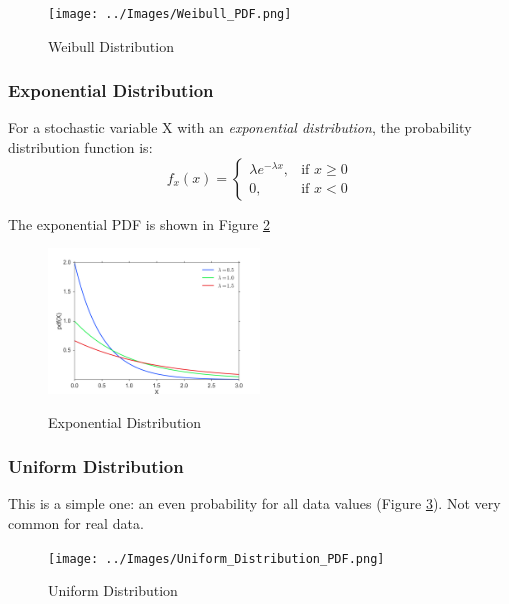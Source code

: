 \begin{figure}
  \centering
  \texttt{[image: ../Images/Weibull\_PDF.png]}\\
  \caption{Weibull Distribution}\label{fig:weibull}
\end{figure}


\subsubsection{Exponential Distribution}

For a stochastic variable X with an \emph{exponential distribution}, the probability distribution function is:
\begin{equation}\label{eq_exponential}
f_x (x) =
  \begin{cases}
\lambda e^{- \lambda x}, & \mbox{if } x \ge 0 \\
0, & \mbox{if } x < 0
\end{cases}
\end{equation}

The exponential PDF is shown in Figure \ref{fig:exponential}
\begin{figure}
  \centering
  \includegraphics[width=0.5\textwidth]{../Images/dist_exp.png}\\
  \caption{Exponential Distribution}\label{fig:exponential}
\end{figure}


\subsubsection{Uniform Distribution}

This is a simple one: an even probability for all data values (Figure \ref{fig:uniform}). Not very common for real data.

\begin{figure}
  \centering
  \texttt{[image: ../Images/Uniform\_Distribution\_PDF.png]}\\
  \caption{Uniform Distribution} \label{fig:uniform}
\end{figure}

